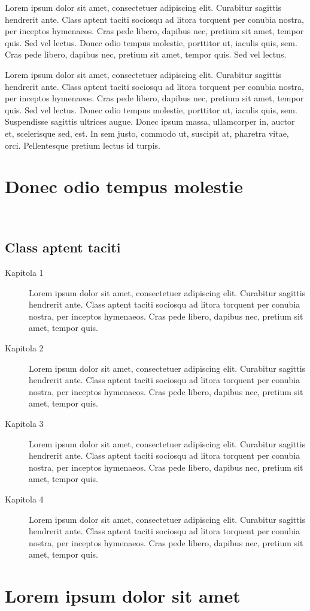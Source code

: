 \begin{chapterabstract}
	Lorem ipsum dolor sit amet, consectetuer adipiscing elit. Curabitur sagittis hendrerit ante. Class aptent taciti sociosqu ad litora torquent per conubia nostra, per inceptos hymenaeos. Cras pede libero, dapibus nec, pretium sit amet, tempor quis. Sed vel lectus. Donec odio tempus molestie, porttitor ut, iaculis quis, sem. Cras pede libero, dapibus nec, pretium sit amet, tempor quis. Sed vel lectus. 
\end{chapterabstract}

Lorem ipsum dolor sit amet, consectetuer adipiscing elit. Curabitur sagittis hendrerit ante. Class aptent taciti sociosqu ad litora torquent per conubia nostra, per inceptos hymenaeos. Cras pede libero, dapibus nec, pretium sit amet, tempor quis. Sed vel lectus. Donec odio tempus molestie, porttitor ut, iaculis quis, sem. Suspendisse sagittis ultrices augue. Donec ipsum massa, ullamcorper in, auctor et, scelerisque sed, est. In sem justo, commodo ut, suscipit at, pharetra vitae, orci. Pellentesque pretium lectus id turpis.~\cite{Kopka2004}

\section{Donec odio tempus molestie}

\lipsum[2]~\cite{def:1, def:2}

\subsection{Class aptent taciti}

\lipsum[2-3]

\begin{description}
\item[Kapitola 1] Lorem ipsum dolor sit amet, consectetuer adipiscing elit. Curabitur sagittis hendrerit ante. Class aptent taciti sociosqu ad litora tor\-quent per conubia nostra, per inceptos hymenaeos. Cras pede libero, dapibus nec, pretium sit amet, tempor quis.

\item[Kapitola 2] Lorem ipsum dolor sit amet, consectetuer adipiscing elit. Curabitur sagittis hendrerit ante. Class aptent taciti sociosqu ad litora tor\-quent per conubia nostra, per inceptos hymenaeos. Cras pede libero, dapibus nec, pretium sit amet, tempor quis.

\item[Kapitola 3] Lorem ipsum dolor sit amet, consectetuer adipiscing elit. Curabitur sagittis hendrerit ante. Class aptent taciti sociosqu ad litora tor\-quent per conubia nostra, per inceptos hymenaeos. Cras pede libero, dapibus nec, pretium sit amet, tempor quis.

\item[Kapitola 4] Lorem ipsum dolor sit amet, consectetuer adipiscing elit. Curabitur sagittis hendrerit ante. Class aptent taciti sociosqu ad litora tor\-quent per conubia nostra, per inceptos hymenaeos. Cras pede libero, dapibus nec, pretium sit amet, tempor quis.~\cite{jakZiskatAcko}
\end{description}

\lipsum[2]

\section{Lorem ipsum dolor sit amet}

\lipsum[3-5]
